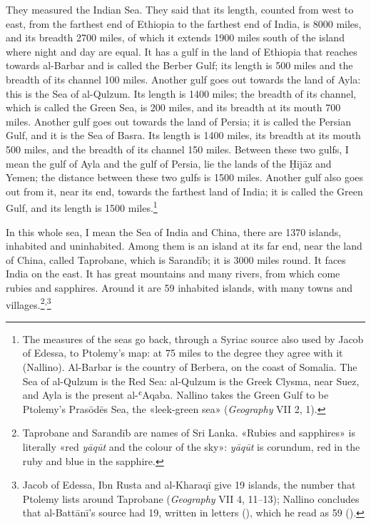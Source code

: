 \documentclass[11pt]{article}
\begin{document}
\par They measured the Indian Sea. They said that its length, counted from west to east, from the farthest end of Ethiopia to the farthest end of India, is 8000 miles, and its breadth 2700 miles, of which it extends 1900 miles south of the island where night and day are equal. It has a gulf in the land of Ethiopia that reaches towards al-Barbar and is called the Berber Gulf; its length is 500 miles and the breadth of its channel 100 miles. Another gulf goes out towards the land of Ayla: this is the Sea of al-Qulzum. Its length is 1400 miles; the breadth of its channel, which is called the Green Sea, is 200 miles, and its breadth at its mouth 700 miles. Another gulf goes out towards the land of Persia; it is called the Persian Gulf, and it is the Sea of Basra. Its length is 1400 miles, its breadth at its mouth 500 miles, and the breadth of its channel 150 miles. Between these two gulfs, I mean the gulf of Ayla and the gulf of Persia, lie the lands of the Ḥijāz and Yemen; the distance between these two gulfs is 1500 miles. Another gulf also goes out from it, near its end, towards the farthest land of India; it is called the Green Gulf, and its length is 1500 miles.\footnote{The measures of the seas go back, through a Syriac source also used by Jacob of Edessa, to Ptolemy's map: at 75 miles to the degree they agree with it (Nallino). Al-Barbar is the country of Berbera, on the coast of Somalia. The Sea of al-Qulzum is the Red Sea: al-Qulzum is the Greek Clysma, near Suez, and Ayla is the present al-ʿAqaba. Nallino takes the Green Gulf to be Ptolemy's Prasōdēs Sea, the «leek-green sea» (\emph{Geography} VII 2, 1).}\par
\par In this whole sea, I mean the Sea of India and China, there are 1370 islands, inhabited and uninhabited. Among them is an island at its far end, near the land of China, called Taprobane, which is Sarandīb; it is 3000 miles round. It faces India on the east. It has great mountains and many rivers, from which come rubies and sapphires. Around it are 59 inhabited islands, with many towns and villages.\footnote{Taprobane and Sarandīb are names of Sri Lanka. «Rubies and sapphires» is literally «red \emph{yāqūt} and the colour of the sky»: \emph{yāqūt} is corundum, red in the ruby and blue in the sapphire.}\textsuperscript{,}\footnote{Jacob of Edessa, Ibn Rusta and al-Kharaqī give 19 islands, the number that Ptolemy lists around Taprobane (\emph{Geography} VII 4, 11–13); Nallino concludes that al-Battānī's source had 19, written in letters (), which he read as 59 ().}\par
\end{document}
